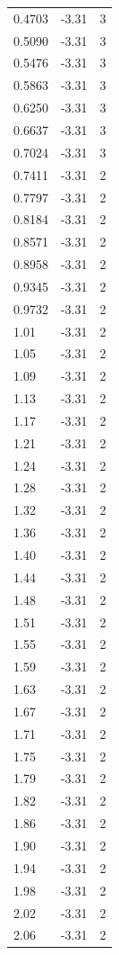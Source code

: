 \begin{longtable}{lrr}
  0.4703 & -3.31 & 3 \\
  0.5090 & -3.31 & 3 \\
  0.5476 & -3.31 & 3 \\
  0.5863 & -3.31 & 3 \\
  0.6250 & -3.31 & 3 \\
  0.6637 & -3.31 & 3 \\
  0.7024 & -3.31 & 3 \\
  0.7411 & -3.31 & 2 \\
  0.7797 & -3.31 & 2 \\
  0.8184 & -3.31 & 2 \\
  0.8571 & -3.31 & 2 \\
  0.8958 & -3.31 & 2 \\
  0.9345 & -3.31 & 2 \\
  0.9732 & -3.31 & 2 \\
  1.01 & -3.31 & 2 \\
  1.05 & -3.31 & 2 \\
  1.09 & -3.31 & 2 \\
  1.13 & -3.31 & 2 \\
  1.17 & -3.31 & 2 \\
  1.21 & -3.31 & 2 \\
  1.24 & -3.31 & 2 \\
  1.28 & -3.31 & 2 \\
  1.32 & -3.31 & 2 \\
  1.36 & -3.31 & 2 \\
  1.40 & -3.31 & 2 \\
  1.44 & -3.31 & 2 \\
  1.48 & -3.31 & 2 \\
  1.51 & -3.31 & 2 \\
  1.55 & -3.31 & 2 \\
  1.59 & -3.31 & 2 \\
  1.63 & -3.31 & 2 \\
  1.67 & -3.31 & 2 \\
  1.71 & -3.31 & 2 \\
  1.75 & -3.31 & 2 \\
  1.79 & -3.31 & 2 \\
  1.82 & -3.31 & 2 \\
  1.86 & -3.31 & 2 \\
  1.90 & -3.31 & 2 \\
  1.94 & -3.31 & 2 \\
  1.98 & -3.31 & 2 \\
  2.02 & -3.31 & 2 \\
  2.06 & -3.31 & 2 \\

\end{longtable}

